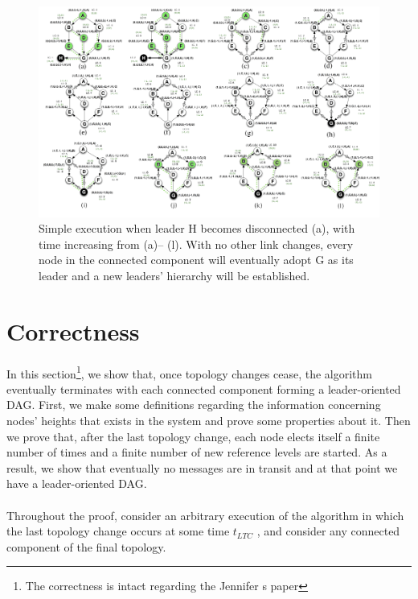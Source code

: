 \documentclass{article}
\begin{document}
\clearpage

\begin{figure}[hbtp]
\centering
\includegraphics[scale=.5]{sample_execution.png}
\caption{Simple execution when leader H becomes disconnected (a), with time increasing from (a)–
(l). With no other link changes, every node in the connected component will eventually adopt G as its leader and a new leaders' hierarchy will be established.}
\end{figure}

\clearpage

\section{Correctness}

\paragraph{}
 
In this section\footnote{The correctness is intact regarding the Jennifer s paper}, we show that, once topology changes cease, the algorithm eventually terminates with each connected component forming a leader-oriented DAG. First, we make some definitions regarding the information concerning nodes’ heights that exists in the system and prove some properties about it. Then we prove that, after the last topology change, each node elects itself a finite number of times and a finite number of new reference levels are started. As a result, we show that eventually no messages are in transit and at that point we have a leader-oriented DAG.
\paragraph{}
Throughout the proof, consider an arbitrary execution of the algorithm in which the last topology change occurs at some time $t_{LTC}$ , and consider any connected component of the final topology.
\end{document}
